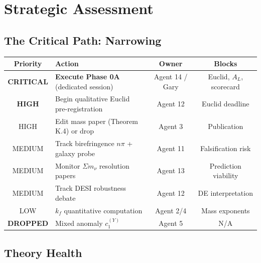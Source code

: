 \documentclass[11pt,a4paper]{article}
\begin{document}
\section{Strategic Assessment}

\subsection{The Critical Path: Narrowing}

\begin{center}
\begin{tabular}{clcc}
\toprule
\textbf{Priority} & \textbf{Action} & \textbf{Owner} & \textbf{Blocks} \\
\midrule
\textbf{CRITICAL} & \textbf{Execute Phase 0A} (dedicated session) & Agent 14 / Gary & Euclid, $A_L$, scorecard \\
\textbf{HIGH} & Begin qualitative Euclid pre-registration & Agent 12 & Euclid deadline \\
HIGH & Edit mass paper (Theorem K.4) or drop & Agent 3 & Publication \\
MEDIUM & Track birefringence $n\pi$ + galaxy probe & Agent 11 & Falsification risk \\
MEDIUM & Monitor $\Sigma m_\nu$ resolution papers & Agent 13 & Prediction viability \\
MEDIUM & Track DESI robustness debate & Agent 12 & DE interpretation \\
LOW & $k_f$ quantitative computation & Agent 2/4 & Mass exponents \\
\textbf{DROPPED} & Mixed anomaly $c_1^{(Y)}$ & Agent 5 & N/A \\
\bottomrule
\end{tabular}
\end{center}

\subsection{Theory Health}
\end{document}
